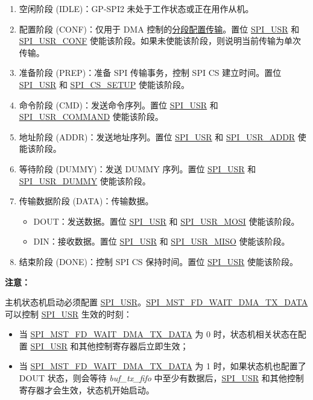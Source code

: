 \documentclass[main\_\_CN.tex]{subfiles}
\begin{document}
\begin{enumerate}
    \item 空闲阶段 (IDLE)：GP-SPI2 未处于工作状态或正在用作从机。
    \item 配置阶段 (CONF)：仅用于 DMA 控制的\hyperref[sec:gp-spi-dma-seg-conf-trans]{分段配置传输}。置位 \hyperref[fielddesc:SPIUSR]{SPI\_USR} 和 \hyperref[fielddesc:SPIUSRCONF]{SPI\_USR\_CONF} 使能该阶段。如果未使能该阶段，则说明当前传输为单次传输。
    \item 准备阶段 (PREP)：准备 SPI 传输事务，控制 SPI CS 建立时间。置位 \hyperref[fielddesc:SPIUSR]{SPI\_USR} 和 \hyperref[fielddesc:SPICSSETUP]{SPI\_CS\_SETUP} 使能该阶段。
    \item\label{phase:cmd} 命令阶段 (CMD)：发送命令序列。置位 \hyperref[fielddesc:SPIUSR]{SPI\_USR} 和 \hyperref[fielddesc:SPIUSRCOMMAND]{SPI\_USR\_COMMAND} 使能该阶段。
    \item\label{phase:addr} 地址阶段 (ADDR)：发送地址序列。置位 \hyperref[fielddesc:SPIUSR]{SPI\_USR} 和 \hyperref[fielddesc:SPIUSRADDR]{SPI\_USR\_ADDR} 使能该阶段。
    \item 等待阶段 (DUMMY)：发送 DUMMY 序列。置位 \hyperref[fielddesc:SPIUSR]{SPI\_USR} 和 \hyperref[fielddesc:SPIUSRDUMMY]{SPI\_USR\_DUMMY} 使能该阶段。
    \item\label{phase:data} 传输数据阶段 (DATA)：传输数据。
    \begin{itemize}
    \item DOUT：发送数据。置位 \hyperref[fielddesc:SPIUSR]{SPI\_USR} 和 \hyperref[fielddesc:SPIUSRMOSI]{SPI\_USR\_MOSI} 使能该阶段。
    \item DIN：接收数据。置位 \hyperref[fielddesc:SPIUSR]{SPI\_USR} 和 \hyperref[fielddesc:SPIUSRMISO]{SPI\_USR\_MISO} 使能该阶段。
    \end{itemize}
    \item 结束阶段 (DONE)：控制 SPI CS 保持时间。置位 \hyperref[fielddesc:SPIUSR]{SPI\_USR} 使能该阶段。
\end{enumerate}

\textbf{注意：\\}

主机状态机启动必须配置 \hyperref[fielddesc:SPIUSR]{SPI\_USR}。\hyperref[fielddesc:SPIMSTFDWAITDMATXDATA]{SPI\_MST\_FD\_WAIT\_DMA\_TX\_DATA} 可以控制 \hyperref[fielddesc:SPIUSR]{SPI\_USR} 生效的时刻：
\begin{itemize}
    \item 当 \hyperref[fielddesc:SPIMSTFDWAITDMATXDATA]{SPI\_MST\_FD\_WAIT\_DMA\_TX\_DATA} 为 0 时，状态机相关状态在配置 \hyperref[fielddesc:SPIUSR]{SPI\_USR} 和其他控制寄存器后立即生效；
    \item 当 \hyperref[fielddesc:SPIMSTFDWAITDMATXDATA]{SPI\_MST\_FD\_WAIT\_DMA\_TX\_DATA} 为 1 时，如果状态机也配置了 DOUT 状态，则会等待 \emph{buf\_tx\_fifo} 中至少有数据后，\hyperref[fielddesc:SPIUSR]{SPI\_USR} 和其他控制寄存器才会生效，状态机开始启动。
\end{itemize}
\end{document}
